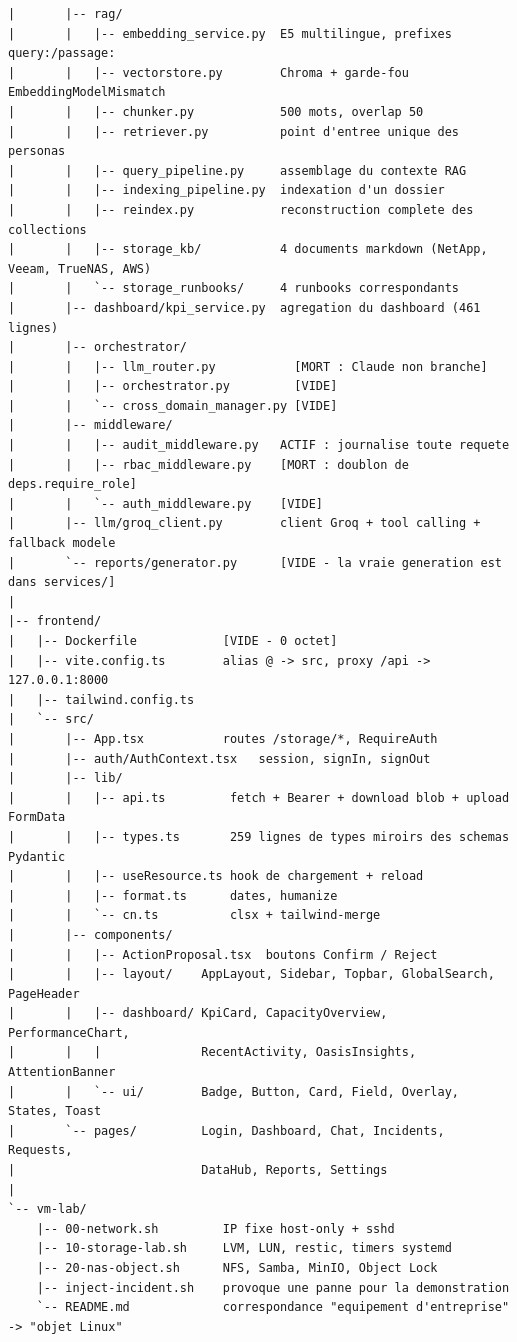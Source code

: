 \documentclass[11pt,a4paper]{report}
\begin{document}
\begin{lstlisting}[caption={Arborescence réelle --- les fichiers vides sont signalés}]
|       |-- rag/
|       |   |-- embedding_service.py  E5 multilingue, prefixes query:/passage:
|       |   |-- vectorstore.py        Chroma + garde-fou EmbeddingModelMismatch
|       |   |-- chunker.py            500 mots, overlap 50
|       |   |-- retriever.py          point d'entree unique des personas
|       |   |-- query_pipeline.py     assemblage du contexte RAG
|       |   |-- indexing_pipeline.py  indexation d'un dossier
|       |   |-- reindex.py            reconstruction complete des collections
|       |   |-- storage_kb/           4 documents markdown (NetApp, Veeam, TrueNAS, AWS)
|       |   `-- storage_runbooks/     4 runbooks correspondants
|       |-- dashboard/kpi_service.py  agregation du dashboard (461 lignes)
|       |-- orchestrator/
|       |   |-- llm_router.py           [MORT : Claude non branche]
|       |   |-- orchestrator.py         [VIDE]
|       |   `-- cross_domain_manager.py [VIDE]
|       |-- middleware/
|       |   |-- audit_middleware.py   ACTIF : journalise toute requete
|       |   |-- rbac_middleware.py    [MORT : doublon de deps.require_role]
|       |   `-- auth_middleware.py    [VIDE]
|       |-- llm/groq_client.py        client Groq + tool calling + fallback modele
|       `-- reports/generator.py      [VIDE - la vraie generation est dans services/]
|
|-- frontend/
|   |-- Dockerfile            [VIDE - 0 octet]
|   |-- vite.config.ts        alias @ -> src, proxy /api -> 127.0.0.1:8000
|   |-- tailwind.config.ts
|   `-- src/
|       |-- App.tsx           routes /storage/*, RequireAuth
|       |-- auth/AuthContext.tsx   session, signIn, signOut
|       |-- lib/
|       |   |-- api.ts         fetch + Bearer + download blob + upload FormData
|       |   |-- types.ts       259 lignes de types miroirs des schemas Pydantic
|       |   |-- useResource.ts hook de chargement + reload
|       |   |-- format.ts      dates, humanize
|       |   `-- cn.ts          clsx + tailwind-merge
|       |-- components/
|       |   |-- ActionProposal.tsx  boutons Confirm / Reject
|       |   |-- layout/    AppLayout, Sidebar, Topbar, GlobalSearch, PageHeader
|       |   |-- dashboard/ KpiCard, CapacityOverview, PerformanceChart,
|       |   |              RecentActivity, OasisInsights, AttentionBanner
|       |   `-- ui/        Badge, Button, Card, Field, Overlay, States, Toast
|       `-- pages/         Login, Dashboard, Chat, Incidents, Requests,
|                          DataHub, Reports, Settings
|
`-- vm-lab/
    |-- 00-network.sh         IP fixe host-only + sshd
    |-- 10-storage-lab.sh     LVM, LUN, restic, timers systemd
    |-- 20-nas-object.sh      NFS, Samba, MinIO, Object Lock
    |-- inject-incident.sh    provoque une panne pour la demonstration
    `-- README.md             correspondance "equipement d'entreprise" -> "objet Linux"
\end{lstlisting}
\end{document}
